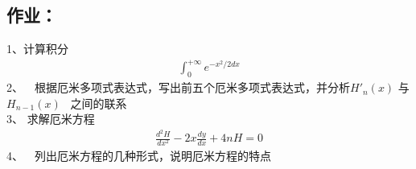 \subsection{作业：}
1、计算积分\\ 
\[\begin{array}{lllllllll}
     \int_{0}^{+\infty} e^{-x^2 /2 dx}
\end{array}\]
2、  根据厄米多项式表达式，写出前五个厄米多项式表达式，并分析$H'_n (x)$ 与$H_{n-1} (x)$  之间的联系\\
3、 求解厄米方程\\ 
\[\begin{array}{lllllllll}
		\frac{d^2 H}{d x^2} -2x \frac{d y}{d x} +4n H =0 	
\end{array}\] 
4、  列出厄米方程的几种形式，说明厄米方程的特点\\